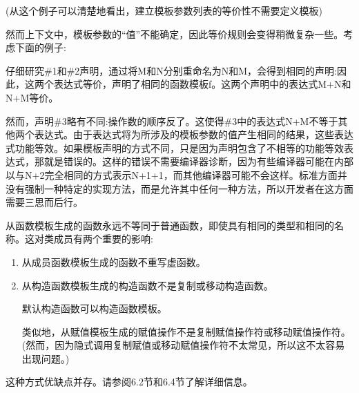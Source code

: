 (从这个例子可以清楚地看出，建立模板参数列表的等价性不需要定义模板)

然而上下文中，模板参数的“值”不能确定，因此等价规则会变得稍微复杂一些。考虑下面的例子:


仔细研究\#1和\#2声明，通过将M和N分别重命名为N和M，会得到相同的声明:因此，这两个表达式等价，声明了相同的函数模板f。这两个声明中的表达式M+N和N+M等价。

然而，声明\#3略有不同:操作数的顺序反了。这使得\#3中的表达式N+M不等于其他两个表达式。由于表达式将为所涉及的模板参数的值产生相同的结果，这些表达式功能等效。如果模板声明的方式不同，只是因为声明包含了不相等的功能等效表达式，那就是错误的。这样的错误不需要编译器诊断，因为有些编译器可能在内部以与N+2完全相同的方式表示N+1+1，而其他编译器可能不会这样。标准方面并没有强制一种特定的实现方法，而是允许其中任何一种方法，所以开发者在这方面需要三思而后行。

从函数模板生成的函数永远不等同于普通函数，即使具有相同的类型和相同的名称。这对类成员有两个重要的影响:

\begin{enumerate}
\item
从成员函数模板生成的函数不重写虚函数。

\item
从构造函数模板生成的构造函数不是复制或移动构造函数。

\begin{notice}
默认构造函数可以构造函数模板。
\end{notice}

类似地，从赋值模板生成的赋值操作不是复制赋值操作符或移动赋值操作符。(然而，因为隐式调用复制赋值或移动赋值操作符不太常见，所以这不太容易出现问题。)
\end{enumerate}

这种方式优缺点并存。请参阅6.2节和6.4节了解详细信息。











